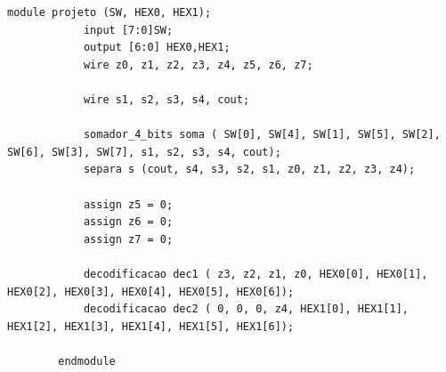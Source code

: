 \begin{lstlisting}[frame=L, caption={Módulo do somador completo e suas dependências.},label=projeto]
		module projeto (SW, HEX0, HEX1);
			input [7:0]SW;
			output [6:0] HEX0,HEX1;
			wire z0, z1, z2, z3, z4, z5, z6, z7;

			wire s1, s2, s3, s4, cout;

			somador_4_bits soma ( SW[0], SW[4], SW[1], SW[5], SW[2], SW[6], SW[3], SW[7], s1, s2, s3, s4, cout);
			separa s (cout, s4, s3, s2, s1, z0, z1, z2, z3, z4);

			assign z5 = 0;
			assign z6 = 0;
			assign z7 = 0;

			decodificacao dec1 ( z3, z2, z1, z0, HEX0[0], HEX0[1], HEX0[2], HEX0[3], HEX0[4], HEX0[5], HEX0[6]);
			decodificacao dec2 ( 0, 0, 0, z4, HEX1[0], HEX1[1], HEX1[2], HEX1[3], HEX1[4], HEX1[5], HEX1[6]);

		endmodule
		\end{lstlisting}







